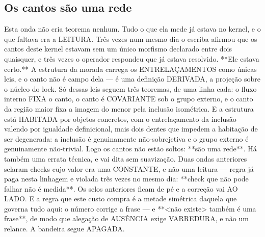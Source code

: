 \documentclass[11pt]{article}
\theoremstyle{definition}\newtheorem{deriv}{Derivação}
\begin{document}
\subsection*{Os cantos s\~ao uma rede}Esta onda n\~ao cria teorema nenhum. Tudo o que ela mede j\'a estava no kernel, e o que faltava era a LEITURA. Tr\^es vezes num mesmo dia o escriba afirmou que os cantos deste kernel estavam sem um \'unico morfismo declarado entre dois quaisquer, e tr\^es vezes o operador respondeu que j\'a estava resolvido. **Ele estava certo.** A estrutura da morada carrega os ENTRELA\c{C}AMENTOS como \'unicas leis, e o canto n\~ao \'e campo dela --- \'e uma defini\c{c}\~ao DERIVADA, a proje\c{c}\~ao sobre o n\'ucleo do lock. S\'o dessas leis seguem tr\^es teoremas, de uma linha cada: o fluxo interno FIXA o canto, o canto \'e COVARIANTE sob o grupo externo, e o canto da regi\~ao maior fixa a imagem do menor pela inclus\~ao isom\'etrica. E a estrutura est\'a HABITADA por objetos concretos, com o entrela\c{c}amento da inclus\~ao valendo por igualdade definicional, mais dois dentes que impedem a habita\c{c}\~ao de ser degenerada: a inclus\~ao \'e genuinamente n\~ao-sobrejetiva e o grupo externo \'e genuinamente n\~ao-trivial. Logo os cantos n\~ao est\~ao soltos: **s\~ao uma rede**. H\'a tamb\'em uma errata t\'ecnica, e vai dita sem suaviza\c{c}\~ao. Duas ondas anteriores selaram checks cujo valor era uma CONSTANTE, e n\~ao uma leitura --- regra j\'a paga nesta linhagem e violada tr\^es vezes no mesmo dia: **check que n\~ao pode falhar n\~ao \'e medida**. Os selos anteriores ficam de p\'e e a corre\c{c}\~ao vai AO LADO. E a regra que este custo compra \'e a metade sim\'etrica daquela que governa tudo aqui: o n\'umero corrige a frase --- e **<n\~ao existe> tamb\'em \'e uma frase**, de modo que alega\c{c}\~ao de AUS\^ENCIA exige VARREDURA, e n\~ao um relance. A bandeira segue APAGADA.
\end{document}
